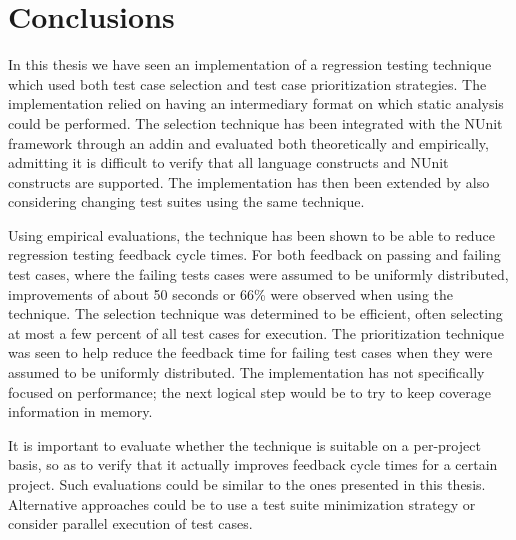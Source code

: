 \documentclass[a4paper,english,12pt]{report}
\let\Chapter\chapter
\def\chapter{\addtocontents{lol}{\protect\addvspace{10pt}}\Chapter}
\begin{document}
\chapter{Conclusions}\label{chap:conclusions}
In this thesis we have seen an implementation of a regression testing technique which used both test case selection and test case prioritization strategies. The implementation relied on having an intermediary format on which static analysis could be performed. The selection technique has been integrated with the NUnit framework through an addin and evaluated both theoretically and empirically, admitting it is difficult to verify that all language constructs and NUnit constructs are supported. The implementation has then been extended by also considering changing test suites using the same technique.

Using empirical evaluations, the technique has been shown to be able to reduce regression testing feedback cycle times. For both feedback on passing and failing test cases, where the failing tests cases were assumed to be uniformly distributed, improvements of about 50 seconds or 66\% were observed when using the technique. The selection technique was determined to be efficient, often selecting at most a few percent of all test cases for execution. The prioritization technique was seen to help reduce the feedback time for failing test cases when they were assumed to be uniformly distributed. The implementation has not specifically focused on performance; the next logical step would be to try to keep coverage information in memory.

It is important to evaluate whether the technique is suitable on a per-project basis, so as to verify that it actually improves feedback cycle times for a certain project.  Such evaluations could be similar to the ones presented in this thesis. Alternative approaches could be to use a test suite minimization strategy or consider parallel execution of test cases.

\cleardoublepage{}
{}



\begin{appendices}
  
  
\end{appendices}


\end{document}
